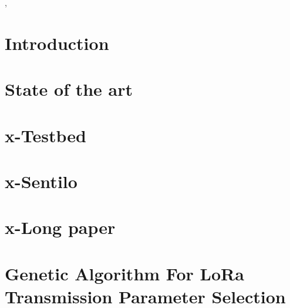 \documentclass[conference]{IEEEtran}
\begin{document}
\begin{refsection},

\preface
\body

\chapter[01:''The secret of a good sermon is to have a good beginning and a good ending, then trying to have the two as close as possible.'' - George Burns]{Introduction}
\chapter[02:''Given one hour to save the planet, I would spend 59 minutes understanding the problem and one minute resolving it.'' - Albert Einstein]{State of the art}
\chapter[03:''Human identity is no longer defined by what one does, but by what one owns. This is not a message of happiness or reassurance, but it is the truth and it is a warning.'' - Jimmy Carter]{x-Testbed}
\chapter[04:''Qu'importe d'où viennent les questions, l'essentiel est d'où partent les réponses.'' - Slimane Benaïssa]{x-Sentilo}
\chapter[05:''I can’t remember the last day I didn’t train'' - Michael Phelps]{x-Long paper}
\chapter[06:''I know what to do and I go and execute'' - Usain Bolt]{Genetic Algorithm For LoRa Transmission Parameter Selection}

\end{refsection}
\end{document}

